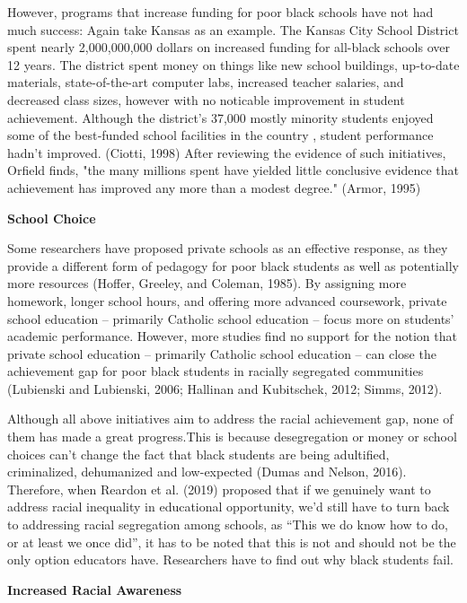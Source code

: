 \noindent However, programs that increase funding for poor black schools have not had much success: Again take Kansas as an example. The Kansas City School District spent nearly 2,000,000,000 dollars on increased funding for all-black schools over 12 years. The district spent money on things like new school buildings, up-to-date materials, state-of-the-art computer labs, increased teacher salaries, and decreased class sizes, however with no noticable improvement in student achievement. Although the district’s 37,000 mostly minority students enjoyed some of the best‐funded school facilities in the country , student performance hadn’t improved. (Ciotti, 1998) After reviewing the evidence of such initiatives, Orfield finds, "the many millions spent have yielded little conclusive evidence that achievement has improved any more than a modest degree." (Armor, 1995)

\noindent\textbf{School Choice}

\noindent Some researchers have proposed private schools as an effective response, as they provide a different form of pedagogy for poor black students as well as potentially more resources (Hoffer, Greeley, and Coleman, 1985). By assigning more homework, longer school hours, and offering more advanced coursework, private school education – primarily Catholic school education – focus more on students’ academic performance. However, more studies find no support for the notion that private school education – primarily Catholic school education – can close the achievement gap for poor black students in racially segregated communities (Lubienski and Lubienski, 2006; Hallinan and Kubitschek, 2012; Simms, 2012).

\noindent Although all above initiatives aim to address the racial achievement gap, none of them has made a great progress.This is because desegregation or money or school choices can’t change the fact that black students are being adultified, criminalized, dehumanized and low-expected (Dumas and Nelson, 2016). Therefore, when Reardon et al. (2019) proposed that if we genuinely want to address racial inequality in educational opportunity, we’d still have to turn back to addressing racial segregation among schools, as “This we do know how to do, or at least we once did”, it has to be noted that this is not and should not be the only option educators have. Researchers have to find out why black students fail.

\noindent\textbf{Increased Racial Awareness}

